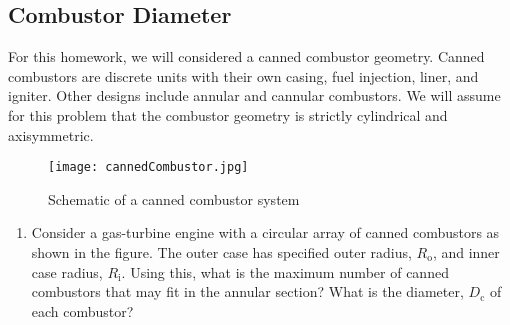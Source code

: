\documentclass[11pt]{article}
\begin{document}
\subsection{Combustor Diameter}
For this homework, we will considered a canned combustor geometry. Canned combustors are discrete units with their own casing, fuel injection, liner, and igniter. Other designs include annular and cannular combustors. We will assume for this problem that the combustor geometry is strictly cylindrical and axisymmetric. 

\begin{figure}[!ht!]
	\begin{center}
		\texttt{[image: cannedCombustor.jpg]}
		\caption{\label{FIG_CC} Schematic of a canned combustor system}
	\end{center}
\end{figure}

\begin{enumerate}[label=(\alph*)]
	\item
    	Consider a gas-turbine engine with a circular array of canned combustors as shown in the figure. The outer case has specified outer radius, $R_\mathrm{o}$, and inner case radius, $R_\mathrm{i}$. Using this, what is the maximum number of canned combustors that may fit in the annular section? What is the diameter, $D_\mathrm{c}$ of each combustor?
\end{enumerate}
\end{document}
